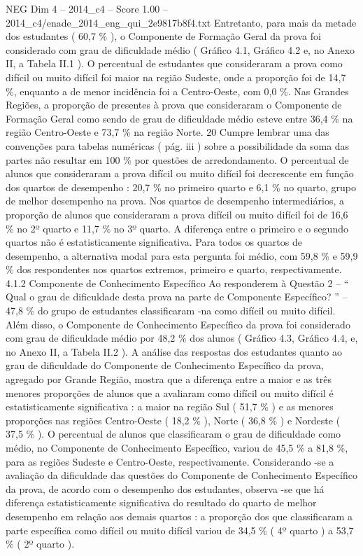 \begin{textsample}{NEG Dim 4 – 2014\_c4 – Score 1.00 – 2014\_c4/enade\_2014\_eng\_qui\_2e9817b8f4.txt}
Entretanto, para mais da metade dos estudantes ( 60,7 \% ), o Componente de Formação Geral da prova foi considerado com grau de dificuldade médio ( Gráfico 4.1, Gráfico 4.2 e, no Anexo II, a Tabela II.1 ).
O percentual de estudantes que consideraram a prova como difícil ou muito difícil foi maior na região Sudeste, onde a proporção foi de 14,7 \%, enquanto a de menor incidência foi a Centro-Oeste, com 0,0 \%.
Nas Grandes Regiões, a proporção de presentes à prova que consideraram o Componente de Formação Geral como sendo de grau de dificuldade médio esteve entre 36,4 \% na região Centro-Oeste e 73,7 \% na região Norte. 20 Cumpre lembrar uma das convenções para tabelas numéricas ( pág. iii ) sobre a possibilidade da soma das partes não resultar em 100 \% por questões de arredondamento.
O percentual de alunos que consideraram a prova difícil ou muito difícil foi decrescente em função dos quartos de desempenho : 20,7 \% no primeiro quarto e 6,1 \% no quarto, grupo de melhor desempenho na prova.
Nos quartos de desempenho intermediários, a proporção de alunos que consideraram a prova difícil ou muito difícil foi de 16,6 \% no 2º quarto e 11,7 \% no 3º quarto.
A diferença entre o primeiro e o segundo quartos não é estatisticamente significativa.
Para todos os quartos de desempenho, a alternativa modal para esta pergunta foi médio, com 59,8 \% e 59,9 \% dos respondentes nos quartos extremos, primeiro e quarto, respectivamente. 4.1.2 Componente de Conhecimento Específico Ao responderem à Questão 2 – “ Qual o grau de dificuldade desta prova na parte de Componente Específico? ” – 47,8 \% do grupo de estudantes classificaram -na como difícil ou muito difícil.
Além disso, o Componente de Conhecimento Específico da prova foi considerado com grau de dificuldade médio por 48,2 \% dos alunos ( Gráfico 4.3, Gráfico 4.4, e, no Anexo II, a Tabela II.2 ).
A análise das respostas dos estudantes quanto ao grau de dificuldade do Componente de Conhecimento Específico da prova, agregado por Grande Região, mostra que a diferença entre a maior e as três menores proporções de alunos que a avaliaram como difícil ou muito difícil é estatisticamente significativa : a maior na região Sul ( 51,7 \% ) e as menores proporções nas regiões Centro-Oeste ( 18,2 \% ), Norte ( 36,8 \% ) e Nordeste ( 37,5 \% ).
O percentual de alunos que classificaram o grau de dificuldade como médio, no Componente de Conhecimento Específico, variou de 45,5 \% a 81,8 \%, para as regiões Sudeste e Centro-Oeste, respectivamente.
Considerando -se a avaliação da dificuldade das questões do Componente de Conhecimento Específico da prova, de acordo com o desempenho dos estudantes, observa -se que há diferença estatisticamente significativa do resultado do quarto de melhor desempenho em relação aos demais quartos : a proporção dos que classificaram a parte específica como difícil ou muito difícil variou de 34,5 \% ( 4º quarto ) a 53,7 \% ( 2º quarto ).

\end{textsample}
